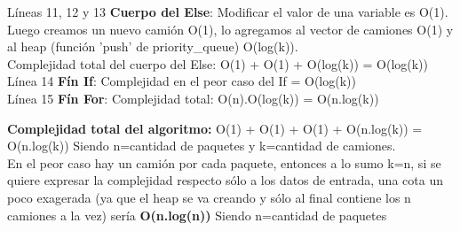 Líneas 11, 12 y 13 \textbf{Cuerpo del Else}: Modificar el valor de una variable es O(1).\\
Luego creamos un nuevo camión O(1), lo agregamos al vector de camiones O(1) y al heap (función 'push' de priority\_queue) O(log(k)).\\
Complejidad total del cuerpo del Else: O(1) + O(1) + O(log(k)) = O(log(k))\\

Línea 14 \textbf{Fín If}: Complejidad en el peor caso del If = O(log(k))\\

Línea 15 \textbf{Fín For}: Complejidad total: O(n).O(log(k)) = O(n.log(k))\\

\begin{flushleft}
\textbf{Complejidad total del algoritmo:} O(1) + O(1) + O(1) + O(n.log(k)) = O(n.log(k)) Siendo n=cantidad de paquetes y k=cantidad de camiones.\\
En el peor caso hay un camión por cada paquete, entonces a lo sumo k=n, si se quiere expresar la complejidad respecto sólo a los datos de entrada, una cota un poco exagerada (ya que el heap se va creando y sólo al final contiene los n camiones a la vez) sería \textbf{O(n.log(n))} Siendo n=cantidad de paquetes\\
\end{flushleft}







